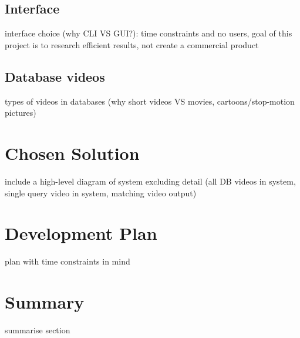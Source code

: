 \subsection{Interface}

interface choice (why CLI VS GUI?): time constraints and no users, goal of this project is to research efficient results, not create a commercial product

\subsection{Database videos}

types of videos in databases (why short videos VS movies, cartoons/stop-motion pictures)

\section{Chosen Solution}

include a high-level diagram of system excluding detail (all DB videos in system, single query video in system, matching video output)

\section{Development Plan}

plan with time constraints in mind

\section{Summary}

summarise section
